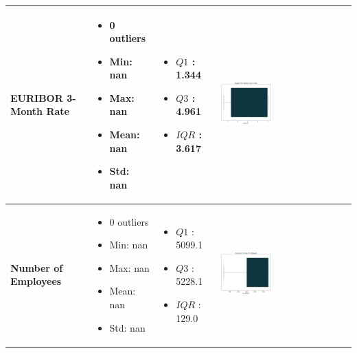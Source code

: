 \documentclass{article}
\begin{document}
\begin{longtable}{|p{}|p{}|p{}|p{}|}
            \hline
            \textbf{EURIBOR 3-Month Rate} & 
            \begin{itemize}
                \item 0 outliers
                \item Min: nan
                \item Max: nan
                \item Mean: nan
                \item Std: nan
            \end{itemize} & 
            \begin{itemize}
                \item $Q1$ : 1.344
                \item $Q3$ : 4.961
                \item $IQR$ : 3.617
            \end{itemize} &
            \includegraphics[width=0.40\textwidth]{data/bank_marketing/pic/Outlier/Eur.png} \\
            \hline
            \textbf{Number of Employees} & 
            \begin{itemize}
                \item 0 outliers
                \item Min: nan
                \item Max: nan
                \item Mean: nan
                \item Std: nan
            \end{itemize} & 
            \begin{itemize}
                \item $Q1$ : 5099.1
                \item $Q3$ : 5228.1
                \item $IQR$ : 129.0
            \end{itemize} &
            \includegraphics[width=0.40\textwidth]{data/bank_marketing/pic/Outlier/num.png} \\
            \hline
            \end{longtable}
\end{document}
